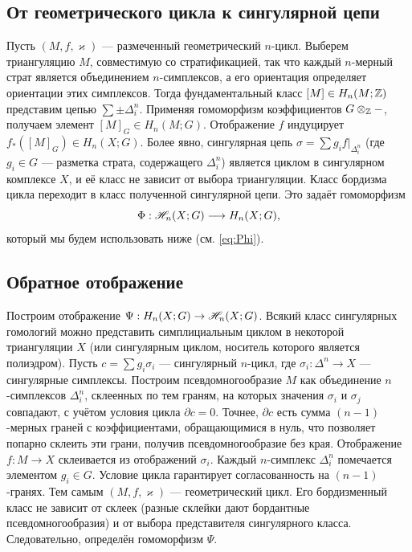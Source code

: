 \documentclass[12pt]{article}
\begin{document}
\subsection{От геометрического цикла к сингулярной цепи}

Пусть $(M,f,\varkappa)$ --- размеченный геометрический $n$-цикл. Выберем триангуляцию $M$, совместимую со стратификацией, так что каждый $n$-мерный страт является объединением $n$-симплексов, а его ориентация определяет ориентации этих симплексов. Тогда фундаментальный класс $[M] \in H_n(M;\mathbb Z)$ представим цепью $\sum \pm \Delta_i^n$. Применяя гомоморфизм коэффициентов $G \otimes_{\mathbb Z} -$, получаем элемент $[M]_G \in H_n(M;G)$. Отображение $f$ индуцирует $f_*([M]_G) \in H_n(X;G)$. Более явно, сингулярная цепь $\sigma = \sum g_i f|_{ \Delta_i^n }$ (где $g_i \in G$ --- разметка страта, содержащего $\Delta_i^n$) является циклом в сингулярном комплексе $X$, и её класс не зависит от выбора триангуляции. Класс бордизма цикла переходит в класс полученной сингулярной цепи. Это задаёт гомоморфизм
\begin{equation}\label{eq:Phi}
\Phi : \mathscr{H}_n(X;G) \longrightarrow H_n(X;G),
\end{equation}
который мы будем использовать ниже (см. \cref{eq:Phi}).

\subsection{Обратное отображение}

Построим отображение $\Psi : H_n(X;G) \to \mathscr{H}_n(X;G)$.  Всякий класс сингулярных гомологий можно представить симплициальным циклом в некоторой триангуляции $X$ (или сингулярным циклом, носитель которого является полиэдром). Пусть $c = \sum g_i \sigma_i$ --- сингулярный $n$-цикл, где $\sigma_i : \Delta^n \to X$ --- сингулярные симплексы. Построим псевдомногообразие $M$ как объединение $n$-симплексов $\Delta_i^n$, склеенных по тем граням, на которых значения $\sigma_i$ и $\sigma_j$ совпадают, с учётом условия цикла $\partial c = 0$. Точнее, $\partial c$ есть сумма $(n-1)$-мерных граней с коэффициентами, обращающимися в нуль, что позволяет попарно склеить эти грани, получив псевдомногообразие без края. Отображение $f: M \to X$ склеивается из отображений $\sigma_i$. Каждый $n$-симплекс $\Delta_i^n$ помечается элементом $g_i \in G$. Условие цикла гарантирует согласованность на $(n-1)$-гранях. Тем самым $(M,f,\varkappa)$ --- геометрический цикл. Его бордизменный класс не зависит от склеек (разные склейки дают бордантные псевдомногообразия) и от выбора представителя сингулярного класса. Следовательно, определён гомоморфизм $\Psi$.
\end{document}
